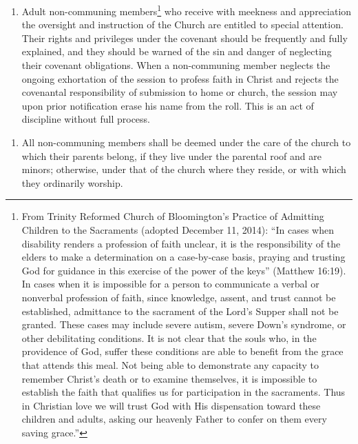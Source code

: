 \documentclass[
]{book}
\providecommand{\tightlist}{%
  \setlength{\itemsep}{0pt}\setlength{\parskip}{0pt}}
\begin{document}
\begin{enumerate}
\def\labelenumi{\arabic{enumi}.}
\setcounter{enumi}{3}
\tightlist
\item
  Adult non-communing members\footnote{From Trinity Reformed Church of Bloomington's Practice of Admitting Children to the Sacraments (adopted December 11, 2014): ``In cases when disability renders a profession of faith unclear, it is the responsibility of the elders to make a determination on a case-by-case basis, praying and trusting God for guidance in this exercise of the power of the keys'' (Matthew 16:19). In cases when it is impossible for a person to communicate a verbal or nonverbal profession of faith, since knowledge, assent, and trust cannot be established, admittance to the sacrament of the Lord's Supper shall not be granted. These cases may include severe autism, severe Down's syndrome, or other debilitating conditions. It is not clear that the souls who, in the providence of God, suffer these conditions are able to benefit from the grace that attends this meal. Not being able to demonstrate any capacity to remember Christ's death or to examine themselves, it is impossible to establish the faith that qualifies us for participation in the sacraments. Thus in Christian love we will trust God with His dispensation toward these children and adults, asking our heavenly Father to confer on them every saving grace.''} who receive with meekness and appreciation the oversight and instruction of the Church are entitled to special attention. Their rights and privileges under the covenant should be frequently and fully explained, and they should be warned of the sin and danger of neglecting their covenant obligations. When a non-communing member neglects the ongoing exhortation of the session to profess faith in Christ and rejects the covenantal responsibility of submission to home or church, the session may upon prior notification erase his name from the roll. This is an act of discipline without full process.
\end{enumerate}

\begin{enumerate}
\def\labelenumi{\arabic{enumi}.}
\setcounter{enumi}{4}
\tightlist
\item
  All non-communing members shall be deemed under the care of the church to which their parents belong, if they live under the parental roof and are minors; otherwise, under that of the church where they reside, or with which they ordinarily worship.
\end{enumerate}
\end{document}
